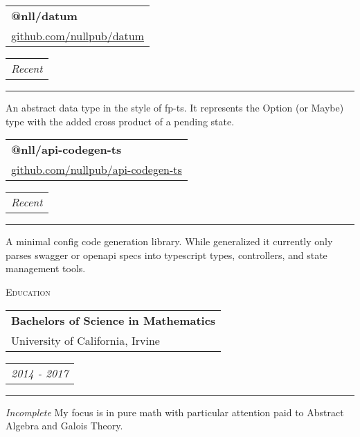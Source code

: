 \documentclass{article}
\makeatletter
\newcommand{\split}[3]{
\noindent\begin{tabular}[t]{@{}l}
    \textbf{#1} \\ #2
\end{tabular}
\hfill
\begin{tabular}[t]{l@{}}
    \\
    \textit{#3}
\end{tabular}
\noindent\rule{\columnwidth}{0.5pt}
}
\newcommand{\sub}[1]{
    {\raggedleft
        \large{\textsc{\color{OliveGreen}#1}}\par
    }
}
\makeatother
\begin{document}
\begin{multicols}{2}
\split{@nll/datum}{\href{https://github.com/nullpub/datum}{github.com/nullpub/datum}}{Recent}
An abstract data type in the style of fp-ts. It represents the Option (or Maybe) type with the added cross product of a pending state.

\split{@nll/api-codegen-ts}{\href{https://github.com/nullpub/api-codegen-ts}{github.com/nullpub/api-codegen-ts}}{Recent}
A minimal config code generation library. While generalized it currently only parses swagger or openapi specs into typescript types, controllers, and state management tools.

\sub{Education}
\split{Bachelors of Science in Mathematics}{University of California, Irvine}{2014 - 2017}
\textit{Incomplete} My focus is in pure math with particular attention paid to Abstract Algebra and Galois Theory.

\end{multicols}
\end{document}
